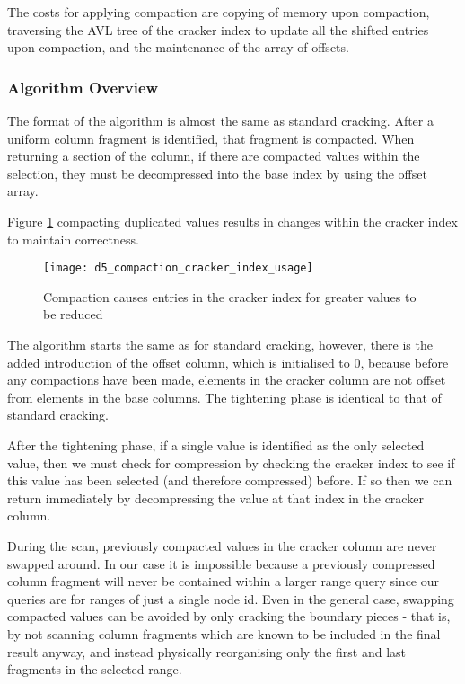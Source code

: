 The costs for applying compaction are copying of memory upon compaction, traversing the AVL tree of the cracker index to update all the shifted entries upon compaction, and the maintenance of the  array of offsets.

\subsubsection{Algorithm Overview}

The format of the algorithm is almost the same as standard cracking. After a uniform column fragment is identified, that fragment is compacted. When returning a section of the column, if there are compacted values within the selection, they must be decompressed into the base index by using the offset array.

Figure \ref{fig:compaction_cracker_index_usage} compacting duplicated values results in changes within the cracker index to maintain correctness.

\begin{figure}[H]
  \texttt{[image: d5\_compaction\_cracker\_index\_usage]}
  \caption{Compaction causes entries in the cracker index for greater values to be reduced}
  \label{fig:compaction_cracker_index_usage}
\end{figure}

The algorithm starts the same as for standard cracking, however, there is the added introduction of the offset column, which is initialised to 0, because before any compactions have been made, elements in the cracker column are not offset from elements in the base columns. The tightening phase is identical to that of standard cracking.

After the tightening phase, if a single value is identified as the only selected value, then we must check for compression by checking the cracker index to see if this value has been selected (and therefore compressed) before. If so then we can return immediately by decompressing the value at that index in the cracker column.

During the scan, previously compacted values in the cracker column are never swapped around. In our case it is impossible because a previously compressed column fragment will never be contained within a larger range query since our queries are for ranges of just a single node id. Even in the general case, swapping compacted values can be avoided by only cracking the boundary pieces - that is, by not scanning column fragments which are known to be included in the final result anyway, and instead physically reorganising only the first and last fragments in the selected range.

